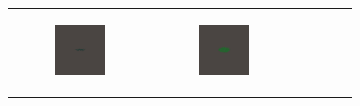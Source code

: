 \documentclass[conference]{IEEEtran}
\newlength{\subfigwidth}
\begin{document}
\begin{figure}
\begin{subfigure}[b]{\textwidth}
\begin{tabular}{r M{\subfigwidth} M{\subfigwidth} M{\subfigwidth} M{\subfigwidth} M{\subfigwidth} }
\begin{subfigure}[b]{\subfigwidth}
                \includegraphics[width=\textwidth]{figures/growth_comparison_lambda_1e-3/soft.0035.png}
            \end{subfigure} &
            \begin{subfigure}[b]{\subfigwidth}
                \includegraphics[width=\textwidth]{figures/growth_comparison_lambda_1e-3/soft.0051.png}

\end{subfigure}
\end{tabular}
\end{subfigure}
\end{figure}
\end{document}
